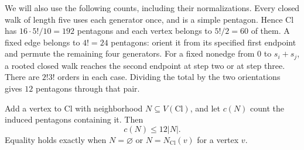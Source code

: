 We will also use the following counts, including their normalizations.
Every closed walk of length five uses each generator once, and is a
simple pentagon. Hence $\mathrm{Cl}$ has $16\cdot5!/10=192$ pentagons
and each vertex belongs to $5!/2=60$ of them. A fixed edge belongs to
$4!=24$ pentagons: orient it from its specified first endpoint and
permute the remaining four generators. For a fixed nonedge from $0$ to
$s_i+s_j$, a rooted closed walk reaches the second endpoint at step two
or at step three. There are $2!3!$ orders in each case. Dividing the
total by the two orientations gives $12$ pentagons through that pair.

\begin{lemma}\label{lem:neighborhood}
Add a vertex to $\mathrm{Cl}$ with neighborhood $N\subseteq V(\mathrm{Cl})$,
and let $c(N)$ count the induced pentagons containing it. Then
\[
 c(N)\leq12|N|.
\]
Equality holds exactly when $N=\varnothing$ or $N=N_{\mathrm{Cl}}(v)$
for a vertex $v$.
\end{lemma}
